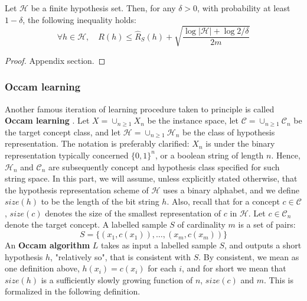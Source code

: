 \documentclass[10pt]{article}
\begin{document}
\begin{theorem}\label{thm:theorem_inconsistent}
    Let $\mathcal{H}$ be a finite hypothesis set. Then, for any $\delta > 0$, with probability at least $1-\delta$, the following inequality holds: 
    \begin{equation}
        \forall h \in \mathcal{H}, \quad R(h) \leq \hat{R}_S (h) + \sqrt{\frac{\log{|\mathcal{H}|}+ \log{2/\delta}}{2m}}
    \end{equation}
\end{theorem}
\begin{proof}
    Appendix section.
\end{proof}

\subsubsection{Occam learning}
Another famous iteration of learning procedure taken to principle is called \textbf{Occam learning} \cite{10.5555/200548}. Let $X= \cup_{n\geq 1} X_n$ be the instance space, let $\mathcal{C}=\cup_{n\geq 1}\mathcal{C}_{n}$ be the target concept class, and let $\mathcal{H}= \cup_{n\geq 1}\mathcal{H}_{n}$ be the class of hypothesis representation. The notation is preferably clarified: $X_{n}$ is under the binary representation typically concerned $\{0,1\}^{n}$, or a boolean string of length $n$. Hence, $\mathcal{H}_{n}$ and $\mathcal{C}_{n}$ are subsequently concept and hypothesis class specified for such string space. In this part, we will assume, unless explicitly stated otherwise, that the hypothesis representation scheme of $\mathcal{H}$ uses a binary alphabet, and we define $size(h)$ to be the length of the bit string $h$. Also, recall that for a concept $c\in \mathcal{C}$, $size(c)$ denotes the size of the smallest representation of $c$ in $\mathcal{H}$. Let $c\in \mathcal{C}_{n}$ denote the target concept. A labelled sample $S$ of cardinality $m$ is a set of pairs: 
\begin{equation*}
    S = \{(x_1, c(x_1)),\dots,(x_m, c(x_m))\}
\end{equation*}
An \textbf{Occam algorithm} $L$ takes as input a labelled sample $S$, and outputs a short hypothesis $h$, "relatively so", that is consistent with $S$. By consistent, we mean as one definition above, $h(x_{i})= c(x_{i})$ for each $i$, and for short we mean that $size(h)$ is a sufficiently slowly growing function of $n$, $size(c)$ and $m$. This is formalized in the following definition. 
\end{document}
